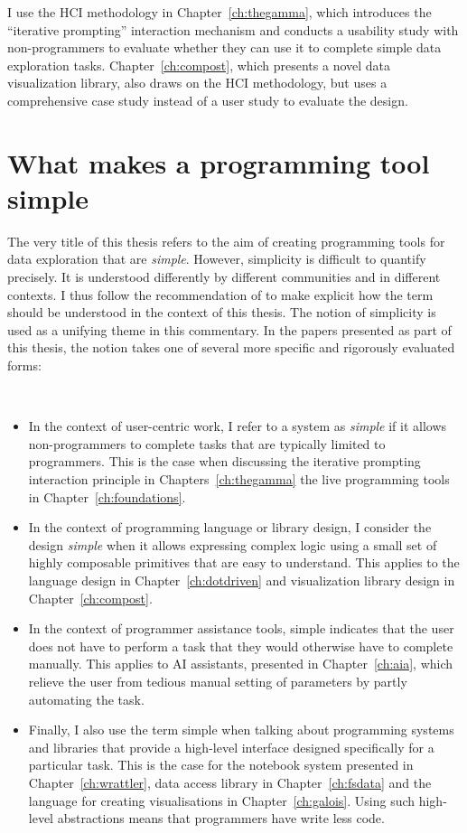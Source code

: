 \documentclass[fleqn,11pt]{report}
\theoremstyle{definition}
\newenvironment{nitemize}
{ \vspace{-0.4em}
  \begin{itemize}
    \setlength{\itemsep}{5pt}
    \setlength{\parskip}{0pt}
    \setlength{\parsep}{0pt} }
{ \end{itemize}
  \vspace{-0.4em} }
\begin{document}
I use the HCI methodology in Chapter~\ref{ch:thegamma}, which introduces the ``iterative prompting''
interaction mechanism and conducts a usability study with non-programmers to evaluate whether
they can use it to complete simple data exploration tasks. Chapter~\ref{ch:compost}, which
presents a novel data visualization library, also draws on the HCI methodology, but uses a
comprehensive case study instead of a user study to evaluate the design.

\section{What makes a programming tool simple}

The very title of this thesis refers to the aim of creating programming tools for data exploration
that are \emph{simple}. However, simplicity is difficult to quantify precisely. It is understood
differently by different communities and in different contexts. I thus follow the recommendation
of \citet{muller-2020-rhetoric} to make explicit how the term should be understood in the
context of this thesis. The notion of simplicity is used as a unifying theme in this commentary.
In the papers presented as part of this thesis, the notion takes one of several more specific and
rigorously evaluated forms:

~

\begin{nitemize}
\item In the context of user-centric work, I refer to a system as \emph{simple} if it allows
  non-programmers to complete tasks that are typically limited to programmers. This is the
  case when discussing the iterative prompting interaction principle in Chapters~\ref{ch:thegamma}
  the live programming tools in Chapter~\ref{ch:foundations}.

\item In the context of programming language or library design, I consider the design \emph{simple}
  when it allows expressing complex logic using a small set of highly composable primitives
  that are easy to understand. This applies to the language design in Chapter~\ref{ch:dotdriven}
  and visualization library design in Chapter~\ref{ch:compost}.

\item In the context of programmer assistance tools, simple indicates that the
  user does not have to perform a task that they would otherwise have to complete manually.
  This applies to AI assistants, presented in Chapter~\ref{ch:aia}, which relieve the user from
  tedious manual setting of parameters by partly automating the task.

\item Finally, I also use the term simple when talking about programming systems and libraries
  that provide a high-level interface designed specifically for a particular task. This is the
  case for the notebook system presented in Chapter~\ref{ch:wrattler}, data access library
  in Chapter~\ref{ch:fsdata} and the language for creating visualisations in Chapter~\ref{ch:galois}.
  Using such high-level abstractions means that programmers have write less code.
\end{nitemize}
\end{document}
